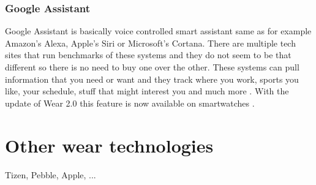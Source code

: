 \subsubsection{Google Assistant}\label{sec:GoogleAssistant}
Google Assistant is basically voice controlled smart assistant same as for example Amazon's Alexa, Apple's Siri or Microsoft's Cortana. There are multiple tech sites that run benchmarks of these systems \cite{ASGA, VACCGASAB, CAGACS, GASBAC} and they do not seem to be that different so there is no need to buy one over the other. These systems can pull information that you need or want and they track where you work, sports you like, your schedule, stuff that might interest you and much more \cite{WIGA}. With the update of Wear 2.0 this feature is now available on smartwatches \cite{AW2UG, AW2WN}.

\section{Other wear technologies}\label{sec:OtherWearTechnologies}
Tizen, Pebble, Apple, ...